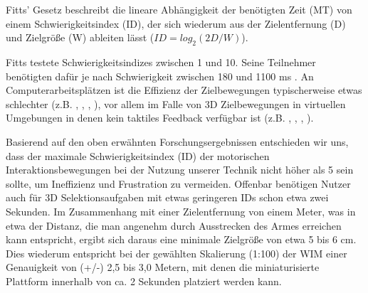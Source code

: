 Fitts' Gesetz beschreibt die lineare Abhängigkeit der benötigten Zeit (MT) von einem
Schwierigkeitsindex (ID), der sich wiederum aus der Zielentfernung (D) und Zielgröße (W) ableiten lässt ($ID=log_2(2D/W)$).

Fitts testete Schwierigkeitsindizes zwischen 1 und 10. Seine Teilnehmer benötigten dafür je nach Schwierigkeit zwischen 180 und 1100 ms \cite{fitts1954information}. An Computerarbeitsplätzen ist die Effizienz der Zielbewegungen typischerweise etwas schlechter (z.B. \cite{Forlines}, \cite{mackenzie1992fitts}, \cite{MacKenzie:2008:FTS:1357054.1357308}, \cite{Wobbrock:2008:EMP:1357054.1357306}), vor 
allem im Falle von 3D Zielbewegungen in virtuellen Umgebungen in denen kein taktiles Feedback verfügbar ist (z.B. \cite{arsenault2004importance}, \cite{grossman2004pointing}, \cite{teather2011pointing}, \cite{lubos2014analysis}).

Basierend auf den oben erwähnten Forschungsergebnissen entschieden wir
uns, dass der maximale Schwierigkeitsindex (ID) der motorischen
Interaktionsbewegungen bei der Nutzung unserer Technik nicht höher als 5 sein sollte, um Ineffizienz und Frustration zu vermeiden. Offenbar benötigen Nutzer auch für 3D Selektionsaufgaben mit etwas geringeren IDs schon etwa zwei Sekunden. Im
Zusammenhang mit einer Zielentfernung von einem Meter, was in etwa der Distanz, die man angenehm durch Ausstrecken des Armes erreichen kann entspricht, ergibt sich daraus eine minimale Zielgröße von etwa 5 bis 6 cm. Dies wiederum entspricht bei der gewählten Skalierung (1:100) der WIM einer Genauigkeit von (+/-) 2,5 bis 3,0 Metern, mit denen die miniaturisierte Plattform innerhalb von ca. 2 Sekunden platziert werden kann.



